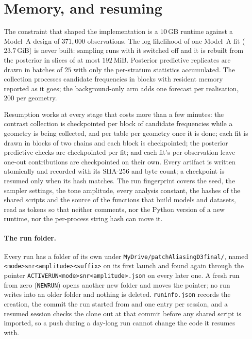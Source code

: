\documentclass[10pt,a4paper]{article}
\newcommand{\code}[1]{\texttt{\UseBreakableUnderscores #1}}
\newcommand{\UseBreakableUnderscores}{\def\_{\textunderscore\allowbreak}}
\begin{document}
\section{Memory, and resuming}
The constraint that shaped the implementation is a $10$\,GB runtime against a Model~A design of $371{,}000$ observations. The log likelihood of one Model~A fit ($23.7$\,GiB) is never built: sampling runs with it switched off and it is rebuilt from the posterior in slices of at most $192$\,MiB. Posterior predictive replicates are drawn in batches of $25$ with only the per-stratum statistics accumulated. The collection processes candidate frequencies in blocks with resident memory reported as it goes; the background-only arm adds one forecast per realisation, $200$ per geometry.

Resumption works at every stage that costs more than a few minutes: the contrast collection is checkpointed per block of candidate frequencies while a geometry is being collected, and per table per geometry once it is done; each fit is drawn in blocks of two chains and each block is checkpointed; the posterior predictive checks are checkpointed per fit; and each fit's per-observation leave-one-out contributions are checkpointed on their own. Every artifact is written atomically and recorded with its SHA-256 and byte count; a checkpoint is resumed only when its hash matches. The run fingerprint covers the seed, the sampler settings, the tone amplitude, every analysis constant, the hashes of the shared scripts and the source of the functions that build models and datasets, read as tokens so that neither comments, nor the Python version of a new runtime, nor the per-process string hash can move it.

\paragraph{The run folder.} Every run has a folder of its own under \code{MyDrive/patchAliasing\_D3\_final/}, named \code{<mode>\_snr<amplitude>\_<UTC time>\_<suffix>} on its first launch and found again through the pointer \code{ACTIVE\_RUN\_<mode>\_snr<amplitude>.json} on every later one. A fresh run from zero (\code{NEW\_RUN}) opens another new folder and moves the pointer; no run writes into an older folder and nothing is deleted. \code{run\_info.json} records the creation, the commit the run started from and one entry per session, and a resumed session checks the clone out at that commit before any shared script is imported, so a push during a day-long run cannot change the code it resumes with.
\end{document}

